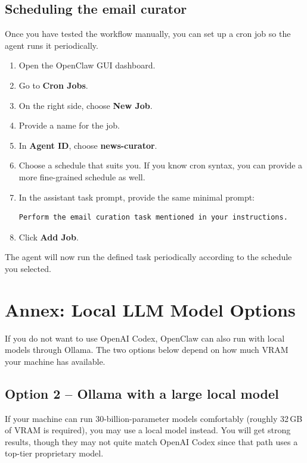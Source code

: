 \documentclass[12pt, a4paper]{article}
\begin{document}
\subsection{Scheduling the email curator}

Once you have tested the workflow manually, you can set up a cron job so the agent runs it periodically.

\begin{enumerate}[leftmargin=1.5em]
\item Open the OpenClaw GUI dashboard.
\item Go to \textbf{Cron Jobs}.
\item On the right side, choose \textbf{New Job}.
\item Provide a name for the job.
\item In \textbf{Agent ID}, choose \textbf{news-curator}.
\item Choose a schedule that suits you. If you know cron syntax, you can provide a more fine-grained schedule as well.
\item In the assistant task prompt, provide the same minimal prompt:
\begin{lstlisting}[style=plainstyle]
Perform the email curation task mentioned in your instructions.
\end{lstlisting}
\item Click \textbf{Add Job}.
\end{enumerate}

The agent will now run the defined task periodically according to the schedule you selected.

\clearpage

\appendix

\section{Annex: Local LLM Model Options}
\label{annex:local-llms}

If you do not want to use OpenAI Codex, OpenClaw can also run with local models through Ollama. The two options below depend on how much VRAM your machine has available.

\subsection{Option 2 -- Ollama with a large local model}

If your machine can run 30-billion-parameter models comfortably (roughly 32\,GB of VRAM is required), you may use a local model instead. You will get strong results, though they may not quite match OpenAI Codex since that path uses a top-tier proprietary model.
\end{document}
